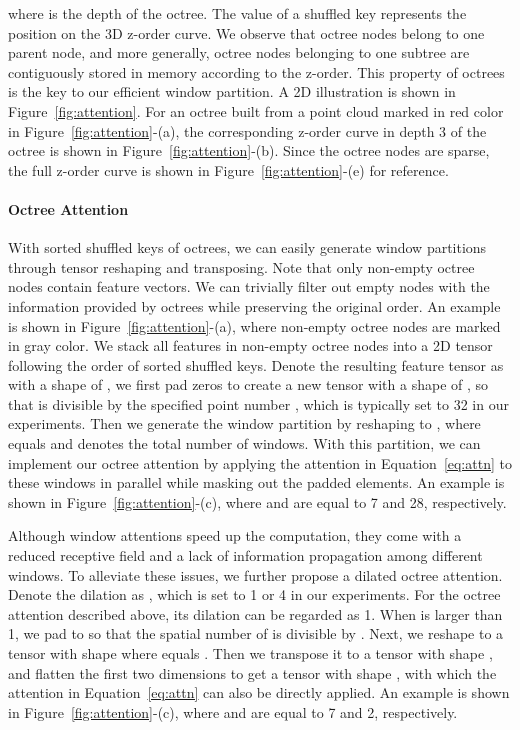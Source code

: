 \documentclass[acmtog,screen,authorversion]{acmart}
\begin{document}
where  is the depth of the octree.
The value of a shuffled key represents the position on the 3D z-order curve.
We observe that octree nodes belong to one parent node, and more generally, octree nodes belonging to one subtree are contiguously stored in memory according to the z-order.
This property of octrees is the key to our efficient window partition.
A 2D illustration is shown in Figure~\ref{fig:attention}.
For an octree built from a point cloud marked in red color in Figure~\ref{fig:attention}-(a), the corresponding z-order curve in depth 3 of the octree is shown in Figure~\ref{fig:attention}-(b).
Since the octree nodes are sparse, the full z-order curve is shown in Figure~\ref{fig:attention}-(e) for reference.


\paragraph{Octree Attention}
With sorted shuffled keys of octrees, we can easily generate window partitions through tensor reshaping and transposing.
Note that only non-empty octree nodes contain feature vectors.
We can trivially filter out empty nodes with the information provided by octrees while preserving the original order.
An example is shown in Figure~\ref{fig:attention}-(a), where non-empty octree nodes are marked in gray color.
We stack all features in non-empty octree nodes into a 2D tensor following the order of sorted shuffled keys.
Denote the resulting feature tensor as  with a shape of , we first pad zeros to create a new tensor  with a shape of , so that  is divisible by the specified point number , which is typically set to 32 in our experiments.
Then we generate the window partition by reshaping  to , where  equals  and denotes the total number of windows.
With this partition, we can implement our octree attention by applying the attention in Equation~\ref{eq:attn} to these  windows in parallel while masking out the padded elements.
An example is shown in Figure~\ref{fig:attention}-(c), where  and  are equal to 7 and 28, respectively.

Although window attentions speed up the computation, they come with a reduced receptive field and a lack of information propagation among different windows.
To alleviate these issues, we further propose a dilated octree attention.
Denote the dilation as , which is set to 1 or 4 in our experiments.
For the octree attention described above, its dilation can be regarded as 1.
When  is larger than 1, we pad  to  so that the spatial number  of  is divisible by .
Next, we reshape  to a tensor with shape  where  equals .
Then we transpose it to a tensor with shape , and flatten the first two dimensions to get a tensor with shape , with which the attention in Equation~\ref{eq:attn} can also be directly applied.
An example is shown in Figure~\ref{fig:attention}-(c), where  and  are equal to 7 and 2, respectively.
\end{document}
